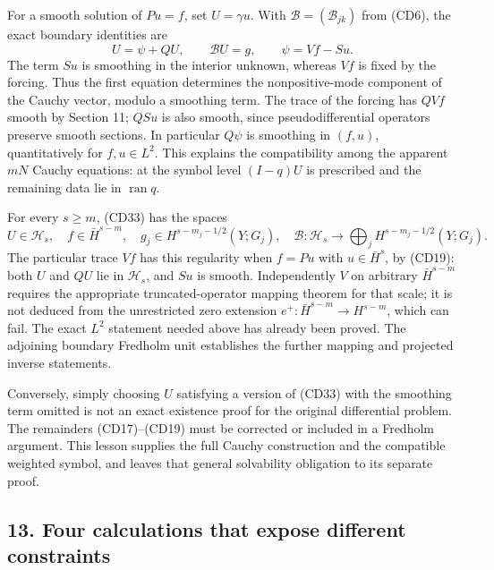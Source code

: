 \documentclass[
  11pt,
]{article}
\begin{document}
For a smooth solution of \(Pu=f\), set \(U=\gamma u\). With
\(\mathcal B=(\mathcal B_{jk})\) from (CD6), the exact boundary
identities are \[
U=\psi+QU,\qquad \mathcal BU=g,\qquad
\psi=Vf-Su.
\tag{CD33}
\] The term \(Su\) is smoothing in the interior unknown, whereas \(Vf\)
is fixed by the forcing. Thus the first equation determines the
nonpositive-mode component of the Cauchy vector, modulo a smoothing
term. The trace of the forcing has \(QVf\) smooth by Section 11; \(QSu\)
is also smooth, since pseudodifferential operators preserve smooth
sections. In particular \(Q\psi\) is smoothing in \((f,u)\),
quantitatively for \(f,u\in L^2\). This explains the compatibility among
the apparent \(mN\) Cauchy equations: at the symbol level \((I-q)U\) is
prescribed and the remaining data lie in \(\operatorname{ran}q\).

For every \(s\geq m\), (CD33) has the spaces \[
U\in\mathcal H_s,\quad f\in\bar H^{s-m},\quad
g_j\in H^{s-m_j-1/2}(Y;G_j),\quad
\mathcal B:\mathcal H_s\to\bigoplus_jH^{s-m_j-1/2}(Y;G_j).
\tag{CD34}
\] The particular trace \(Vf\) has this regularity when \(f=Pu\) with
\(u\in\bar H^s\), by (CD19): both \(U\) and \(QU\) lie in
\(\mathcal H_s\), and \(Su\) is smooth. Independently \(V\) on arbitrary
\(\bar H^{s-m}\) requires the appropriate truncated-operator mapping
theorem for that scale; it is not deduced from the unrestricted zero
extension \(e^+:\bar H^{s-m}\to H^{s-m}\), which can fail. The exact
\(L^2\) statement needed above has already been proved. The adjoining
boundary Fredholm unit establishes the further mapping and projected
inverse statements.

Conversely, simply choosing \(U\) satisfying a version of (CD33) with
the smoothing term omitted is not an exact existence proof for the
original differential problem. The remainders (CD17)--(CD19) must be
corrected or included in a Fredholm argument. This lesson supplies the
full Cauchy construction and the compatible weighted symbol, and leaves
that general solvability obligation to its separate proof.

\subsection{13. Four calculations that expose different
constraints}\label{four-calculations-that-expose-different-constraints}
\end{document}
